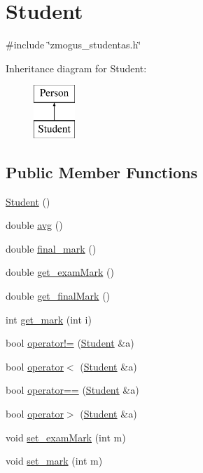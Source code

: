 \hypertarget{classStudent}{}\section{Student}
\label{classStudent}


{\ttfamily \#include \char`\"{}zmogus\+\_\+studentas.\+h\char`\"{}}

Inheritance diagram for Student\+:\begin{figure}[H]
\begin{center}
\leavevmode
\includegraphics[height=2.000000cm]{classStudent}
\end{center}
\end{figure}
\subsection*{Public Member Functions}
\begin{DoxyCompactItemize}
\item 
\mbox{\hyperlink{classStudent_a26ceb532f001722145707442f5f26480}{Student}} ()
\item 
double \mbox{\hyperlink{classStudent_a6d3f7cc8886fe956a5de14b07e1ca457}{avg}} ()
\item 
double \mbox{\hyperlink{classStudent_ae99a413149615469071dc30895d34bca}{final\+\_\+mark}} ()
\item 
double \mbox{\hyperlink{classStudent_ab996e975f082192a02077a8c5665aa25}{get\+\_\+exam\+Mark}} ()
\item 
double \mbox{\hyperlink{classStudent_a227227aa7b579cc83a3e0d37bd309e59}{get\+\_\+final\+Mark}} ()
\item 
int \mbox{\hyperlink{classStudent_a94ee4d5b4ddd8e4b2ac5204453fb1f6d}{get\+\_\+mark}} (int i)
\item 
bool \mbox{\hyperlink{classStudent_ab1f4cbc4e32a29b489b87b31366bb4e7}{operator!=}} (\mbox{\hyperlink{classStudent}{Student}} \&a)
\item 
bool \mbox{\hyperlink{classStudent_aac01d66b5c4cf429210264eb9d33c84e}{operator$<$}} (\mbox{\hyperlink{classStudent}{Student}} \&a)
\item 
bool \mbox{\hyperlink{classStudent_af3677abbb99886c6c422c63ed2967c19}{operator==}} (\mbox{\hyperlink{classStudent}{Student}} \&a)
\item 
bool \mbox{\hyperlink{classStudent_aa0d55242e485d234a9df02cc1065bc94}{operator$>$}} (\mbox{\hyperlink{classStudent}{Student}} \&a)
\item 
void \mbox{\hyperlink{classStudent_a51de6f509d2414a9cc9ddae1198f020c}{set\+\_\+exam\+Mark}} (int m)
\item 
void \mbox{\hyperlink{classStudent_a08cede177ec5ed67bec7281eaced7b8e}{set\+\_\+mark}} (int m)
\end{DoxyCompactItemize}
